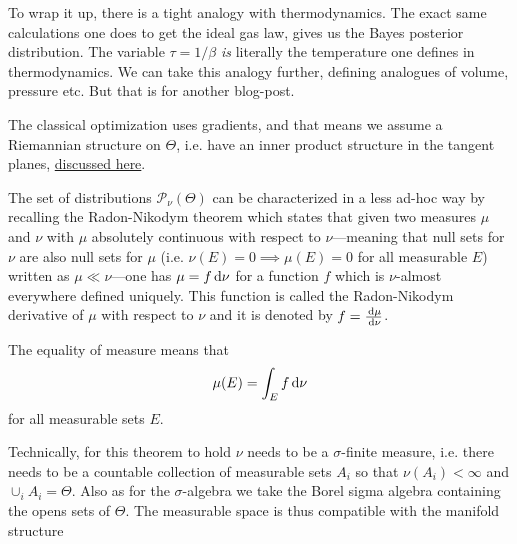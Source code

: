 \documentclass[12pt]{amsart}
\begin{document}
To wrap it up, there is a tight analogy with thermodynamics. The exact same calculations one does to get the ideal gas law, gives us the Bayes posterior distribution. The variable $\tau = 1/\beta$ \emph{is} literally the temperature one defines in thermodynamics. We can take this analogy further, defining analogues of volume, pressure etc. But that is for another blog-post. 


\begin{remark}
The classical optimization uses gradients, and that means we assume a Riemannian structure on $\Theta$, i.e. have an inner product structure in the tangent planes,  \href{https://ekiral.github.io/blog/2025-08-01_what-is-gradient.html}{discussed here}.
\end{remark}
\begin{remark}
The set of distributions $\mathcal{P}_\nu(\Theta)$ can be characterized in a less ad-hoc way by recalling the Radon-Nikodym theorem which states that given two measures $\mu$ and $\nu$ with $\mu$ absolutely continuous with respect to $\nu$---meaning that null sets for $\nu$ are also null sets for $\mu$ (i.e. $\nu(E) = 0 \implies \mu(E) = 0$ for all measurable $E$) written as $\mu \ll \nu$---one has $\mu = f\,\mathrm{d}\nu$ for a function $f$ which is $\nu$-almost everywhere defined uniquely. This function is called the Radon-Nikodym derivative of $\mu$ with respect to $\nu$ and it is denoted by $f= \frac{\,\mathrm{d}\mu}{\,\mathrm{d}\nu}$.

The equality of measure means that
\[
	\mu(E) = \int_{E} f \,\mathrm{d}\nu
\]
for all measurable sets $E$.

Technically, for this theorem to hold $\nu$ needs to be a $\sigma$-finite measure, i.e. there needs to be a countable collection of measurable sets $A_i$ so that $\nu(A_i) < \infty$ and $\cup_{i} A_i = \Theta$. Also as for the $\sigma$-algebra we take the Borel sigma algebra containing the opens sets of $\Theta$. The measurable space is thus compatible with the manifold structure
\end{remark}
\end{document}
